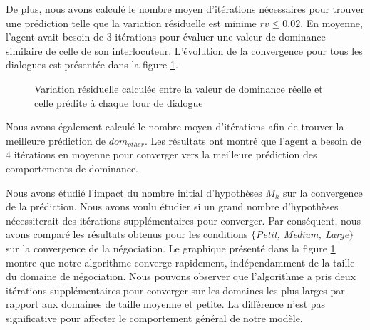 	De plus, nous avons calculé le nombre moyen d'itérations nécessaires pour trouver une prédiction telle que la variation résiduelle est minime $ rv \leq 0.02 $. En moyenne, l'agent avait besoin de $3$ itérations pour évaluer une valeur de dominance similaire de celle de son interlocuteur. L'évolution de la convergence pour tous les dialogues est présentée dans la figure \ref{fig:converge}.
	\begin{figure}[]
		\caption{Variation résiduelle calculée entre la valeur de dominance réelle et celle prédite à chaque tour de dialogue} 
		\label{fig:converge}
	\end{figure}
	Nous avons également calculé le nombre moyen d'itérations afin de trouver la meilleure prédiction de $ dom_{other} $. Les résultats ont montré que l'agent a besoin de $4$ itérations en moyenne pour converger vers la meilleure prédiction des comportements de dominance.
	
	Nous avons étudié l'impact du nombre initial d'hypothèses $M_h$ sur la convergence de la prédiction. Nous avons voulu étudier si un grand nombre d'hypothèses nécessiterait des itérations supplémentaires pour converger. Par conséquent, nous avons comparé les résultats obtenus pour les conditions \emph {$\{$Petit, Medium, Large$\}$} sur la convergence de la négociation. Le graphique présenté dans la figure \ref {fig:converge} montre que notre algorithme converge rapidement, indépendamment de la taille du domaine de négociation. Nous pouvons observer que l'algorithme a pris deux itérations supplémentaires pour converger sur les domaines les plus larges par rapport aux domaines de taille moyenne et petite. La différence n'est pas significative pour affecter le comportement général de notre modèle.
	
